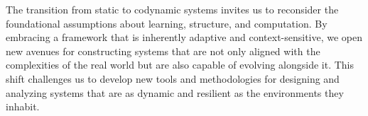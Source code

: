 The transition from static to codynamic systems invites us to reconsider the foundational assumptions about learning, structure, and computation. By embracing a framework that is inherently adaptive and context-sensitive, we open new avenues for constructing systems that are not only aligned with the complexities of the real world but are also capable of evolving alongside it. This shift challenges us to develop new tools and methodologies for designing and analyzing systems that are as dynamic and resilient as the environments they inhabit.
